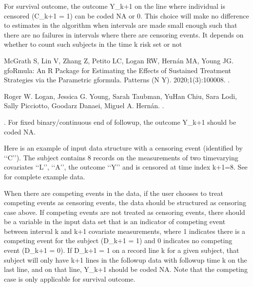\documentclass[letterpaper,10pt,english]{sphinxmanual}
\begin{document}
\sphinxAtStartPar
For survival outcome, the outcome Y\_k+1 on the line where individual is censored (C\_k+1 = 1) can be coded NA or 0.
This choice will make no difference to estimates in the algorithm when intervals are made small enough
such that there are no failures in intervals where there are censoring events. It depends on
whether to count such subjects in the time k risk set or not \sphinxstepexplicit %
\begin{footnote}[1]\label{\thesphinxscope.1}%
\sphinxAtStartFootnote
McGrath S, Lin V, Zhang Z, Petito LC, Logan RW, Hernán MA, Young JG. gfoRmula: An R Package for Estimating the Effects of Sustained Treatment Strategies via the Parametric g\sphinxhyphen{}formula. Patterns (N Y). 2020;1(3):100008. .
%
\end{footnote} \sphinxstepexplicit %
\begin{footnote}[2]\label{\thesphinxscope.2}%
\sphinxAtStartFootnote
Roger W. Logan, Jessica G. Young, Sarah Taubman, Yu\sphinxhyphen{}Han Chiu, Sara Lodi, Sally Picciotto, Goodarz Danaei, Miguel A. Hernán. .
%
\end{footnote}. For fixed binary/continuous end of follow\sphinxhyphen{}up, the
outcome Y\_k+1 should be coded NA.

\sphinxAtStartPar
Here is an example of input data structure with a censoring event (identified by ‘‘C’’). The subject contains 8 records on the measurements of
two time\sphinxhyphen{}varying covariates ‘‘L’’, ‘‘A’’, the outcome ‘‘Y’’ and is censored at time index k+1=8. See  for complete example data.
\begin{quote}

\end{quote}

\sphinxAtStartPar
{} When there are competing events in the data, if the user chooses to treat competing
events as censoring events, the data should be structured as censoring case above. If competing events
are not treated as censoring events, there should be a variable in the input data set that is an
indicator of competing event between interval k and k+1 covariate measurements, where
1 indicates there is a competing event for the subject (D\_k+1 = 1) and 0 indicates no competing event (D\_k+1 = 0).
If D\_k+1 = 1 on a record line k for a given subject, that subject will only have k+1 lines
in the follow\sphinxhyphen{}up data with follow\sphinxhyphen{}up time k on the last line, and on that line, Y\_k+1 should be coded NA.
Note that the competing case is only applicable for survival outcome.
\end{document}
